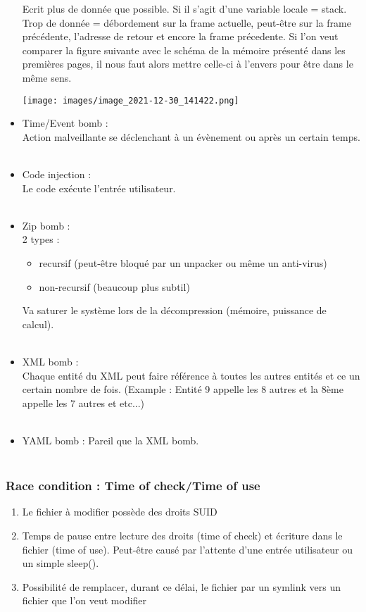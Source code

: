 \documentclass[a4paper]{article}
\begin{document}
\begin{itemize}[label = \textbullet, font = \Large]
    Ecrit plus de donnée que possible. Si il s'agit d'une variable locale = stack. Trop de donnée = débordement sur la frame actuelle, peut-être sur la frame précédente, l'adresse de retour et encore la frame précedente. Si l'on veut comparer la figure suivante avec le schéma de la mémoire présenté dans les premières pages, il nous faut alors mettre celle-ci à l'envers pour être dans le même sens.
        \begin{center}
            \texttt{[image: images/image\_2021-12-30\_141422.png]}
        \end{center}
    \item  Time/Event bomb :\\
    Action malveillante se déclenchant à un évènement ou après un certain temps.\\\\
    \item Code injection :\\
    Le code exécute l'entrée utilisateur.\\\\
    \item Zip bomb :\\
    2 types :
    \begin{itemize}
        \item recursif (peut-être bloqué par un unpacker ou même un anti-virus)
        \item non-recursif (beaucoup plus subtil)
    \end{itemize}
    Va saturer le système lors de la décompression (mémoire, puissance de calcul).\\\\
    \item XML bomb :\\
    Chaque entité du XML peut faire référence à toutes les autres entités et ce un certain nombre de fois. (Example : Entité 9 appelle les 8 autres et la 8ème appelle les 7 autres et etc...)\\\\
    \item YAML bomb : 
    Pareil que la XML bomb.\\\\
    
\end{itemize}

\subsubsection{Race condition : Time of check/Time of use}
\begin{enumerate}
    \item Le fichier à modifier possède des droits SUID
    \item Temps de pause entre lecture des droits (time of check) et écriture dans le fichier (time of use). Peut-être causé par l'attente d'une entrée utilisateur ou un simple sleep().
    \item Possibilité de remplacer, durant ce délai, le fichier par un symlink vers un fichier que l'on veut modifier
\end{enumerate}
\end{document}
